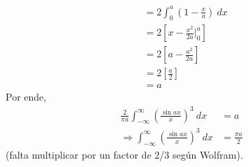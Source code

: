 \documentclass[12pt]{report}
\newcounter{it}
\theoremstyle{largebreak}
\begin{document}
\begin{sol}
\begin{equation*}
\begin{split}
                &=2\int_{0}^a \left(1-\frac{x}{a}\right)\:dx\\
                &=2\left[x-\frac{x^2}{2a}\Big|_{ 0}^a\right]\\
                &=2\left[a-\frac{a^2}{2a}\right]\\
                &=2\left[\frac{a}{2}\right]\\
                &=a
            \end{split}
        \end{equation*}
        Por ende,
        \begin{equation*}
            \begin{split}
                \frac{2}{\pi a}\int_{-\infty}^{\infty}\left(\frac{\sin ax}{x}\right)^3\:dx&=a\\
                \Rightarrow \int_{-\infty}^{\infty}\left(\frac{\sin ax}{x}\right)^3\:dx&=\frac{\pi a}{2}
            \end{split}
        \end{equation*}
        (falta multiplicar por un factor de 2/3 según Wolfram).
    \end{sol}
\end{document}

